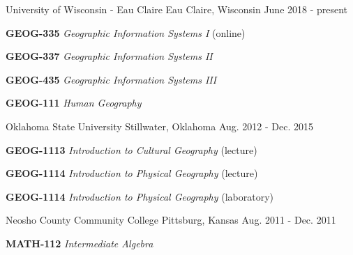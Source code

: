 

  \begin{cventries}
    \cventry
      {}
      {University of Wisconsin - Eau Claire}
      {Eau Claire, Wisconsin}
      {June 2018 - present}
      {
        \vspace{-3mm}
        \begin{expitems}
        \item {\textbf{GEOG-335} \textit{Geographic Information Systems I} (online)}
        \item {\textbf{GEOG-337} \textit{Geographic Information Systems II}}
        \item {\textbf{GEOG-435} \textit{Geographic Information Systems III}}
        \item {\textbf{GEOG-111} \textit{Human Geography}}
        \end{expitems}
      }
  
    \cventry
      {}
      {Oklahoma State University}
      {Stillwater, Oklahoma}
      {Aug. 2012 - Dec. 2015}
      {
        \vspace{-3mm}
        \begin{expitems}
        \item {\textbf{GEOG-1113} \textit{Introduction to Cultural Geography}
            (lecture)}
        \item {\textbf{GEOG-1114} \textit{Introduction to Physical Geography} (lecture)}
        \item {\textbf{GEOG-1114} \textit{Introduction to Physical Geography} (laboratory)}
        \end{expitems}
      }
  
    \cventry
      {}
      {Neosho County Community College}
      {Pittsburg, Kansas}
      {Aug. 2011 - Dec. 2011}
      {
        \vspace{-3mm}
        \begin{expitems}
          \item {\textbf{MATH-112} \textit{Intermediate Algebra}}
        \end{expitems}
      }
  
  \end{cventries}


